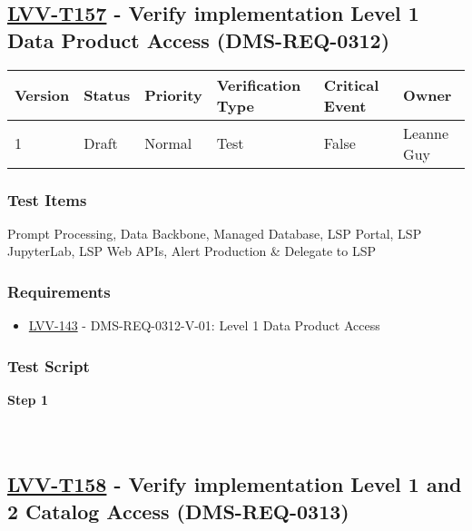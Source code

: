 \hypertarget{lvv-t157---verify-implementation-level-1-data-product-access-dms-req-0312}{%
\subsection{\texorpdfstring{\href{https://jira.lsstcorp.org/secure/Tests.jspa\#/testCase/LVV-T157}{LVV-T157}
- Verify implementation Level 1 Data Product Access
(DMS-REQ-0312)}{LVV-T157 - Verify implementation Level 1 Data Product Access (DMS-REQ-0312)}}\label{lvv-t157---verify-implementation-level-1-data-product-access-dms-req-0312}}

\begin{longtable}[]{@{}llllll@{}}
\toprule
Version & Status & Priority & Verification Type & Critical Event &
Owner\tabularnewline
\midrule
\endhead
1 & Draft & Normal & Test & False & Leanne Guy\tabularnewline
\bottomrule
\end{longtable}

\hypertarget{test-items-133}{%
\subsubsection{Test Items}\label{test-items-133}}

Prompt Processing, Data Backbone, Managed Database, LSP Portal, LSP
JupyterLab, LSP Web APIs, Alert Production \& Delegate to LSP

\hypertarget{requirements-134}{%
\subsubsection{Requirements}\label{requirements-134}}

\begin{itemize}
\tightlist
\item
  \href{https://jira.lsstcorp.org/browse/LVV-143}{LVV-143} -
  DMS-REQ-0312-V-01: Level 1 Data Product Access
\end{itemize}

\hypertarget{test-script-134}{%
\subsubsection{Test Script}\label{test-script-134}}

\textbf{Step 1}\\
~\\
~\\

\hypertarget{lvv-t158---verify-implementation-level-1-and-2-catalog-access-dms-req-0313}{%
\subsection{\texorpdfstring{\href{https://jira.lsstcorp.org/secure/Tests.jspa\#/testCase/LVV-T158}{LVV-T158}
- Verify implementation Level 1 and 2 Catalog Access
(DMS-REQ-0313)}{LVV-T158 - Verify implementation Level 1 and 2 Catalog Access (DMS-REQ-0313)}}\label{lvv-t158---verify-implementation-level-1-and-2-catalog-access-dms-req-0313}}

